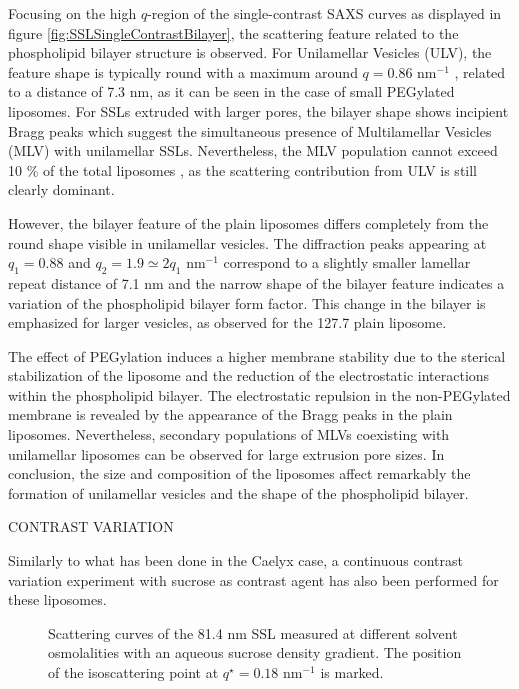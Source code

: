 Focusing on the high $q$-region of the single-contrast SAXS curves as displayed in figure \ref{fig:SSLSingleContrastBilayer}, the scattering feature related to the phospholipid bilayer structure is observed. For Unilamellar Vesicles (ULV), the feature shape is typically round with a maximum around $q=0.86$ nm$^{-1}$ \cite{varga_characterization_2012}, related to a distance of 7.3 nm, as it can be seen in the case of small PEGylated liposomes. For SSLs extruded with larger pores, the bilayer shape shows incipient Bragg peaks which suggest the simultaneous presence of Multilamellar Vesicles (MLV) with unilamellar SSLs. Nevertheless, the MLV population cannot exceed 10 $\%$ of the total liposomes \cite{sakuragi_transformation_2011}, as the scattering contribution from ULV is still clearly dominant.

However, the bilayer feature of the plain liposomes differs completely from the round shape visible in unilamellar vesicles. The diffraction peaks appearing at $q_1=0.88$ and $q_2=1.9\simeq2q_1$ nm$^{-1}$ correspond to a slightly smaller lamellar repeat distance of 7.1 nm and the narrow shape of the bilayer feature indicates a variation of the phospholipid bilayer form factor. This change in the bilayer is emphasized for larger vesicles, as observed for the 127.7 plain liposome.

The effect of PEGylation induces a higher membrane stability due to the sterical stabilization of the liposome and the reduction of the electrostatic interactions within the phospholipid bilayer. The electrostatic repulsion in the non-PEGylated membrane is revealed by the appearance of the Bragg peaks in the plain liposomes. Nevertheless, secondary populations of MLVs coexisting with unilamellar liposomes can be observed for large extrusion pore sizes. In conclusion, the size and composition of the liposomes affect remarkably the formation of unilamellar vesicles and the shape of the phospholipid bilayer.


CONTRAST VARIATION

Similarly to what has been done in the Caelyx case, a continuous contrast variation experiment with sucrose as contrast agent has also been performed for these liposomes.

\begin{figure}
	\centering
		
		\caption{Scattering curves of the 81.4 nm SSL measured at different solvent osmolalities with an aqueous sucrose density gradient. The position of the isoscattering point at $q^{\star}=0.18$ nm$^{-1}$ is marked.}
		\label{fig:SSLContinuousSAXS}
\end{figure}

